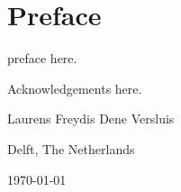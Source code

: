 \chapter*{Preface}
preface here.

\vspace{1\baselineskip}

\noindent
Acknowledgements here.

\vspace{1\baselineskip}

\noindent
Laurens Freydis Dene Versluis

\vspace{1\baselineskip}

\noindent
Delft, The Netherlands

\noindent
\today